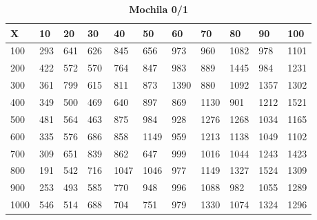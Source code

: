 \documentclass[10pt,letterpaper]{article}
\begin{document}
\newpage 
{}
\begin{center}
\begin{table}\renewcommand{\arraystretch}{2.5}
\caption{\large \textbf{Mochila 0/1}}
\centering
\begin{tabular} { |m{0.5cm}|m{1.3cm}|m{1.3cm}|m{1.3cm}|m{1.3cm}|m{1.3cm}|m{1.3cm}|m{1.3cm}|m{1.3cm}|m{1.3cm}|m{1.3cm}|} 
\hline
\rowcolor{Gray}
\centering \textbf{X} & \centering \textbf{10} & \centering \textbf{20} & \centering \textbf{30}\ & \centering \textbf{40} & \centering \textbf{50} & \centering \textbf{60}\ & \centering \textbf{70} & \centering \textbf{80} & \centering \textbf{90}\ & \textbf{100} \\\hline
\cellcolor{Gray}100 & \Large 293 & \Large 641 & \Large 626 & \Large 845 & \Large 656 & \Large 973 & \Large 960 & \Large 1082 & \Large 978 & \Large 1101 \\
\hline
\cellcolor{Gray}200 & \Large 422 & \Large 572 & \Large 570 & \Large 764 & \Large 847 & \Large 983 & \Large 889 & \Large 1445 & \Large 984 & \Large 1231 \\
\hline
\cellcolor{Gray}300 & \Large 361 & \Large 799 & \Large 615 & \Large 811 & \Large 873 & \Large 1390 & \Large 880 & \Large 1092 & \Large 1357 & \Large 1302 \\
\hline
\cellcolor{Gray}400 & \Large 349 & \Large 500 & \Large 469 & \Large 640 & \Large 897 & \Large 869 & \Large 1130 & \Large 901 & \Large 1212 & \Large 1521 \\
\hline
\cellcolor{Gray}500 & \Large 481 & \Large 564 & \Large 463 & \Large 875 & \Large 984 & \Large 928 & \Large 1276 & \Large 1268 & \Large 1034 & \Large 1165 \\
\hline
\cellcolor{Gray}600 & \Large 335 & \Large 576 & \Large 686 & \Large 858 & \Large 1149 & \Large 959 & \Large 1213 & \Large 1138 & \Large 1049 & \Large 1102 \\
\hline
\cellcolor{Gray}700 & \Large 309 & \Large 651 & \Large 839 & \Large 862 & \Large 647 & \Large 999 & \Large 1016 & \Large 1044 & \Large 1243 & \Large 1423 \\
\hline
\cellcolor{Gray}800 & \Large 191 & \Large 542 & \Large 716 & \Large 1047 & \Large 1046 & \Large 977 & \Large 1149 & \Large 1327 & \Large 1524 & \Large 1309 \\
\hline
\cellcolor{Gray}900 & \Large 253 & \Large 493 & \Large 585 & \Large 770 & \Large 948 & \Large 996 & \Large 1088 & \Large 982 & \Large 1055 & \Large 1289 \\
\hline
\cellcolor{Gray}1000 & \Large 546 & \Large 514 & \Large 688 & \Large 704 & \Large 751 & \Large 979 & \Large 1330 & \Large 1074 & \Large 1324 & \Large 1296 \\
\hline
\end{tabular} \\
\end{table}
\end{center}
\end{document}
